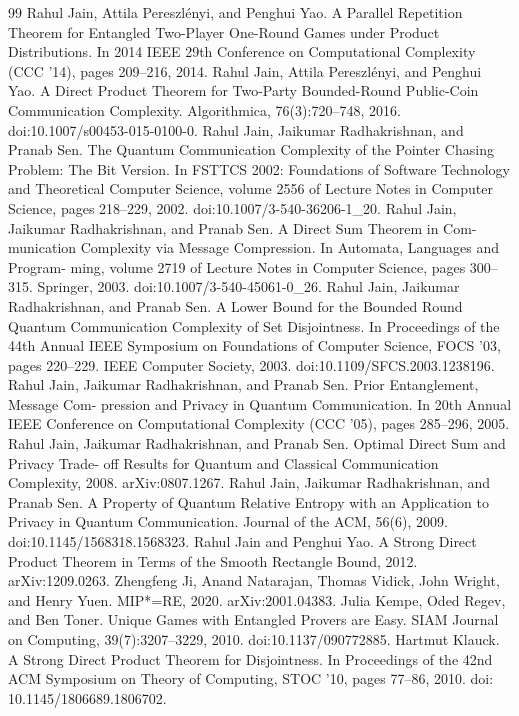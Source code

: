 \documentclass[10pt,a4paper]{article}
\begin{document}
\begin{thebibliography}{99}
 Rahul Jain, Attila Pereszlényi, and Penghui Yao. A Parallel Repetition Theorem for Entangled Two-Player One-Round Games under Product Distributions. In 2014 IEEE 29th Conference on Computational Complexity (CCC ’14), pages 209–216, 2014.
 Rahul Jain, Attila Pereszlényi, and Penghui Yao. A Direct Product Theorem for Two-Party Bounded-Round Public-Coin Communication Complexity. Algorithmica, 76(3):720–748, 2016. doi:10.1007/s00453-015-0100-0.
 Rahul Jain, Jaikumar Radhakrishnan, and Pranab Sen. The Quantum Communication Complexity of the Pointer Chasing Problem: The Bit Version. In FSTTCS 2002: Foundations of Software Technology and Theoretical Computer Science, volume 2556 of Lecture Notes in Computer Science, pages 218–229, 2002. doi:10.1007/3-540-36206-1\_20.
 Rahul Jain, Jaikumar Radhakrishnan, and Pranab Sen. A Direct Sum Theorem in Com- munication Complexity via Message Compression. In Automata, Languages and Program- ming, volume 2719 of Lecture Notes in Computer Science, pages 300–315. Springer, 2003. doi:10.1007/3-540-45061-0\_26.
 Rahul Jain, Jaikumar Radhakrishnan, and Pranab Sen. A Lower Bound for the Bounded Round Quantum Communication Complexity of Set Disjointness. In Proceedings of the 44th Annual IEEE Symposium on Foundations of Computer Science, FOCS ’03, pages 220–229. IEEE Computer Society, 2003. doi:10.1109/SFCS.2003.1238196.
 Rahul Jain, Jaikumar Radhakrishnan, and Pranab Sen. Prior Entanglement, Message Com- pression and Privacy in Quantum Communication. In 20th Annual IEEE Conference on Computational Complexity (CCC ’05), pages 285–296, 2005.
 Rahul Jain, Jaikumar Radhakrishnan, and Pranab Sen. Optimal Direct Sum and Privacy Trade- off Results for Quantum and Classical Communication Complexity, 2008. arXiv:0807.1267.
 Rahul Jain, Jaikumar Radhakrishnan, and Pranab Sen. A Property of Quantum Relative Entropy with an Application to Privacy in Quantum Communication. Journal of the ACM, 56(6), 2009. doi:10.1145/1568318.1568323.
 Rahul Jain and Penghui Yao. A Strong Direct Product Theorem in Terms of the Smooth Rectangle Bound, 2012. arXiv:1209.0263.
 Zhengfeng Ji, Anand Natarajan, Thomas Vidick, John Wright, and Henry Yuen. MIP*=RE, 2020. arXiv:2001.04383.
 Julia Kempe, Oded Regev, and Ben Toner. Unique Games with Entangled Provers are Easy. SIAM Journal on Computing, 39(7):3207–3229, 2010. doi:10.1137/090772885.
 Hartmut Klauck. A Strong Direct Product Theorem for Disjointness. In Proceedings of the 42nd ACM Symposium on Theory of Computing, STOC ’10, pages 77–86, 2010. doi: 10.1145/1806689.1806702.

\end{thebibliography}
\end{document}
